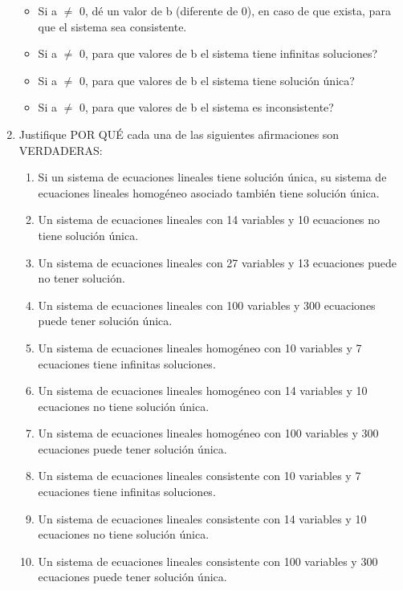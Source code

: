 \documentclass{article}
\begin{document}
\begin{enumerate}
\begin{itemize}
            \item Si a \(\neq\) 0, dé un valor de b (diferente de 0), en caso de que exista, para que el sistema sea consistente. \\
            \item Si a \(\neq\) 0, para que valores de b el sistema tiene infinitas soluciones? \\
            \item Si a \(\neq\) 0, para que valores de b el sistema tiene solución única? \\
            \item Si a \(\neq\) 0, para que valores de b el sistema es inconsistente? \\
        \end{itemize}

    \setcounter{enumi}{7}
    \item Justifique POR QUÉ cada una de las siguientes afirmaciones son VERDADERAS:
        \begin{enumerate}[label=\listAlph]
			\item Si un sistema de ecuaciones lineales tiene solución única, su sistema de ecuaciones lineales homogéneo asociado también tiene solución única.
			\item Un sistema de ecuaciones lineales con 14 variables y 10 ecuaciones no tiene solución única.
			\item Un sistema de ecuaciones lineales con 27 variables y 13 ecuaciones puede no tener solución.
			\item Un sistema de ecuaciones lineales con 100 variables y 300 ecuaciones puede tener solución única.
			\item Un sistema de ecuaciones lineales homogéneo con 10 variables y 7 ecuaciones tiene infinitas soluciones.
			\item Un sistema de ecuaciones lineales homogéneo con 14 variables y 10 ecuaciones no tiene solución única.
			\item Un sistema de ecuaciones lineales homogéneo con 100 variables y 300 ecuaciones puede tener solución única.
			\item Un sistema de ecuaciones lineales consistente con 10 variables y 7 ecuaciones tiene infinitas soluciones.
			\item Un sistema de ecuaciones lineales consistente con 14 variables y 10 ecuaciones no tiene solución única.
			\item Un sistema de ecuaciones lineales consistente con 100 variables y 300 ecuaciones puede tener solución única.
        \end{enumerate}


\end{enumerate}
\end{document}
